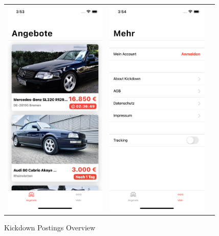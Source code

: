 \begin{figure}[htbp]
    \begin{tabular}{p{}p{}p{}}
        \begin{minipage}{.33\textwidth}
            \centering
            \includegraphics[width=\linewidth, height=300pt]{images/kickdown_presentation/kickdown_overview_screen.png}
            \caption{Kickdown Postings Overview}
            \label{fig:kickdown_overview_screen}
        \end{minipage}
        &
        \begin{minipage}{.33\textwidth}
            \centering
            \includegraphics[width=\linewidth, height=300pt]{images/kickdown_presentation/kickdown_more_screen.png}

\end{minipage}
\end{tabular}
\end{figure}
